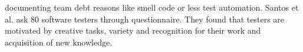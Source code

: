 \documentclass[conference, compsoc, twoside]{IEEEtran}
\begin{document}
documenting team debt reasons like smell code or less test automation.
Santos et al.\cite{Santos201795} ask 80 software testers through questionnaire. They found that testers are motivated by creative tasks, variety and recognition for their work and acquisition of new knowledge.\cite{Santos201795}
\end{document}
